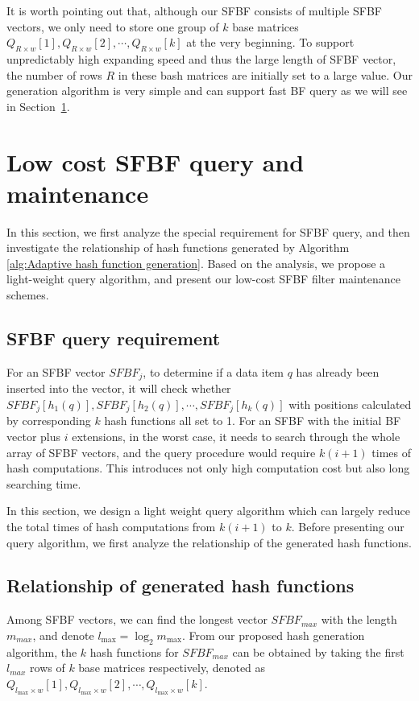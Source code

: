\documentclass[10pt,journal,compsoc]{IEEEtran}
\begin{document}
It is worth pointing out that, although our SFBF consists of multiple SFBF vectors,
we only need to store one group of $k$ base matrices ${Q_{R \times w}}[1],{Q_{R \times w}}[2], \cdots ,{Q_{R \times w}}[k]$ at the very beginning. To support unpredictably high expanding speed and thus the large length of SFBF vector, the number of rows $R$ in these bash matrices are initially set to a large value.
Our generation algorithm is very simple and can support fast BF query as we will see in Section~\ref{sec: Low Cost Information Query and Data Maintenance}.

\section{Low cost SFBF query and maintenance}
\label{sec: Low Cost Information Query and Data Maintenance}
In this section, we first analyze the special requirement for SFBF query, and then investigate the relationship of
hash functions generated by Algorithm \ref{alg:Adaptive hash function generation}. Based on the analysis, we propose a light-weight query algorithm, and present our low-cost SFBF filter maintenance schemes.

\subsection{SFBF query requirement}
For an SFBF vector $SFBF_j$, to determine if a data item $q$ has already been inserted into the vector, it will check whether $SFBF_j[{h_1}\left( {{q}} \right)],SFBF_j[{h_2}\left( {{q}} \right)], \cdots, SFBF_j[{h_k}\left( {{q}} \right)]$ with positions calculated by corresponding $k$ hash functions all set to 1. For an SFBF with the initial BF vector plus $i$ extensions, in the worst case, it needs to search through the whole array of SFBF vectors, and the query procedure would require $k(i+1)$ times of hash computations. This  introduces not only high computation cost but also long searching time.

In this section, we design a light weight query algorithm which can largely reduce the total times of hash computations  from $k(i+1)$ to $k$. Before  presenting our query algorithm, we first analyze the relationship of the generated hash functions.

\subsection{Relationship of generated hash functions}
Among SFBF vectors, we can find the longest vector $SFBF_{max}$ with the length $m_{max}$, and denote ${l_{\max }} = {\log _2}{m_{\max }}$. From our proposed hash generation algorithm, the $k$ hash functions for $SFBF_{max}$ can be obtained by taking the first $l_{max}$ rows of $k$ base matrices respectively, denoted as ${Q_{{l_{\max }} \times w}}[1],{Q_{{l_{\max }} \times w}}[2], \cdots ,{Q_{{l_{\max }} \times w}}[k]$.
\end{document}
